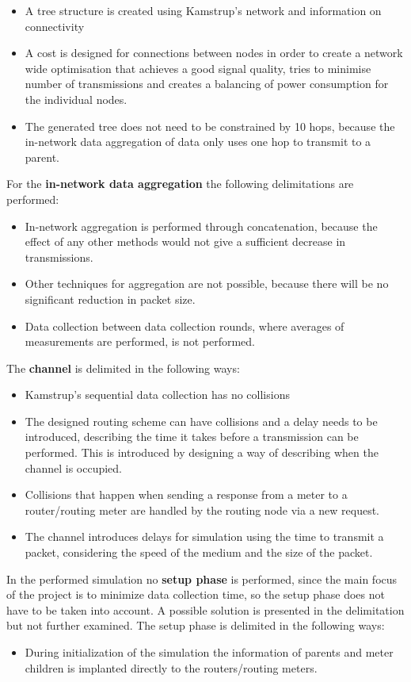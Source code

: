 \begin{itemize}
\item A tree structure is created using Kamstrup's network and information on connectivity
\item A cost is designed for connections between nodes in order to create a network wide optimisation that achieves a good signal quality, tries to minimise number of transmissions and creates a balancing of power consumption for the individual nodes.
\item The generated tree does not need to be constrained by 10 hops, because the in-network data aggregation of data only uses one hop to transmit to a parent.
\end{itemize}

For the \textbf{in-network data aggregation} the following delimitations are performed:
\begin{itemize}
\item In-network aggregation is performed through concatenation, because the effect of any other methods would not give a sufficient decrease in transmissions.
\item Other techniques for aggregation are not possible, because there will be no significant reduction in packet size.
\item Data collection between data collection rounds, where averages of measurements are performed, is not performed.
\end{itemize}

The \textbf{channel} is delimited in the following ways:
\begin{itemize}
\item Kamstrup's sequential data collection has no collisions
\item The designed routing scheme can have collisions and a delay needs to be introduced, describing the time it takes before a transmission can be performed. This is introduced by designing a way of describing when the channel is occupied.
\item Collisions that happen when sending a response from a meter to a router/routing meter are handled by the routing node via a new request.
\item The channel introduces delays for simulation using the time to transmit a packet, considering the speed of the medium and the size of the packet.
\end{itemize}

In the performed simulation no \textbf{setup phase} is performed, since the main focus of the project is to minimize data collection time, so the setup phase does not have to be taken into account. A possible solution is presented in the delimitation but not further examined. The setup phase is delimited in the following ways:
\begin{itemize}
\item During initialization of the simulation the information of parents and meter children is implanted directly to the routers/routing meters.
\end{itemize}

